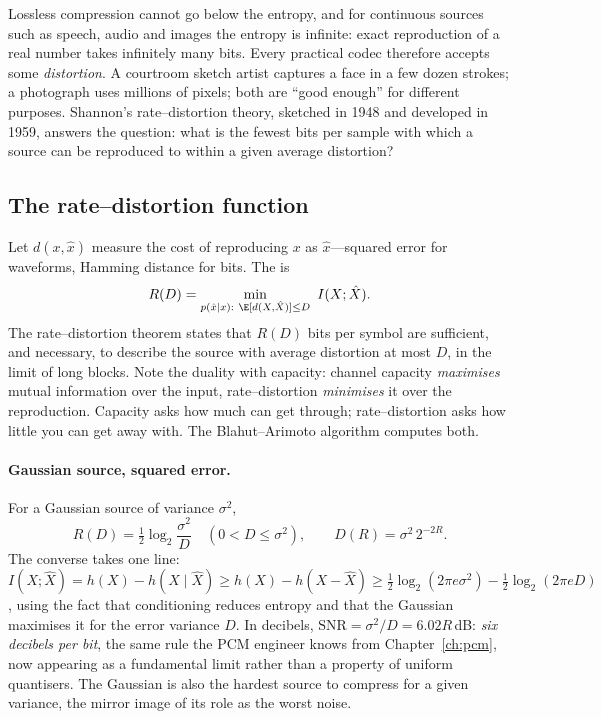 Lossless compression cannot go below the entropy, and for continuous sources such as speech, audio
and images the entropy is infinite: exact reproduction of a real number takes infinitely many bits.
Every practical codec therefore accepts some \emph{distortion}. A courtroom sketch artist captures a
face in a few dozen strokes; a photograph uses millions of pixels; both are ``good enough'' for
different purposes. Shannon's rate--distortion theory, sketched in 1948 and developed in 1959,
answers the question: what is the fewest bits per sample with which a source can be reproduced to
within a given average distortion?

\subsection{The rate--distortion function}

Let $d(x,\hat x)$ measure the cost of reproducing $x$ as $\hat x$---squared error for waveforms,
Hamming distance for bits. The  is
\begin{equation}
R(D)=\min_{p(\hat x\mid x):\ \E[d(X,\hat X)]\le D}\ I(X;\hat X).
\label{eq:ch13:rd}
\end{equation}
The rate--distortion theorem states that $R(D)$ bits per symbol are sufficient, and necessary, to
describe the source with average distortion at most $D$, in the limit of long blocks. Note the
duality with capacity: channel capacity \emph{maximises} mutual information over the input,
rate--distortion \emph{minimises} it over the reproduction. Capacity asks how much can get through;
rate--distortion asks how little you can get away with. The Blahut--Arimoto algorithm computes
both.

\paragraph{Gaussian source, squared error.} For a Gaussian source of variance $\sigma^2$,
\begin{equation}
R(D)=\tfrac12\log_2\frac{\sigma^2}D\quad(0<D\le\sigma^2),\qquad
D(R)=\sigma^2\,2^{-2R}.
\label{eq:ch13:rdgauss}
\end{equation}
The converse takes one line: $I(X;\hat X)=h(X)-h(X\mid\hat X)\ge h(X)-h(X-\hat X)\ge
\frac12\log_2(2\pi e\sigma^2)-\frac12\log_2(2\pi eD)$, using the fact that conditioning reduces
entropy and that the Gaussian maximises it for the error variance $D$. In decibels,
$\mathrm{SNR}=\sigma^2/D=6.02R$\,dB: \emph{six decibels per bit}, the same rule the PCM engineer
knows from Chapter~\ref{ch:pcm}, now appearing as a fundamental limit rather than a property of
uniform quantisers. The Gaussian is also the hardest source to compress for a given variance, the
mirror image of its role as the worst noise.

